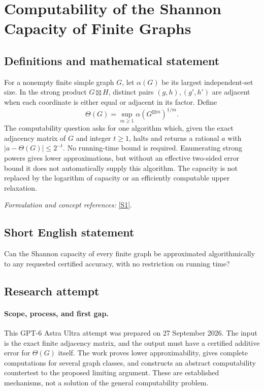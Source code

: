 \documentclass[11pt]{article}
\begin{document}
\section*{\texorpdfstring{Computability of the Shannon Capacity of Finite Graphs}{Computability of the Shannon Capacity of Finite Graphs}}\label{statement}
\subsection{Definitions and mathematical statement}
For a nonempty finite simple graph $G$, let $\alpha(G)$ be its largest independent-set size. In the strong product $G\boxtimes H$, distinct pairs $(g,h),(g',h')$ are adjacent when each coordinate is either equal or adjacent in its factor. Define
\[
 \Theta(G)=\sup_{m\ge1}\alpha(G^{\boxtimes m})^{1/m}.
\]
The computability question asks for one algorithm which, given the exact adjacency matrix of $G$ and integer $t\ge1$, halts and returns a rational $a$ with $|a-\Theta(G)|\le2^{-t}$. No running-time bound is required. Enumerating strong powers gives lower approximations, but without an effective two-sided error bound it does not automatically supply this algorithm. The capacity is not replaced by the logarithm of capacity or an efficiently computable upper relaxation.
\par\smallskip\textit{Formulation and concept references:} \href{https://arxiv.org/html/2010.06873v3}{[S1]}.

\subsection{Short English statement}
Can the Shannon capacity of every finite graph be approximated algorithmically to any requested certified accuracy, with no restriction on running time?
\subsection{Research attempt}
\paragraph{Scope, process, and first gap.}
This GPT-6 Astra Ultra attempt was prepared on 27 September 2026. The input is the exact finite adjacency matrix, and the output must have a certified additive error for $\Theta(G)$ itself. The work proves lower approximability, gives complete computations for several graph classes, and constructs an abstract computability countertest to the proposed limiting argument. These are established mechanisms, not a solution of the general computability problem.
\end{document}
